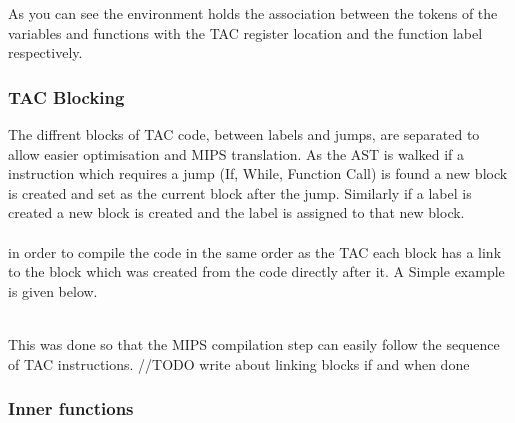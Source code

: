 \documentclass{article}
\begin{document}

As you can see the environment holds the association between the tokens of the variables
and functions with the TAC register location and the function label respectively.

\subsubsection{TAC Blocking}

The diffrent blocks of TAC code, between labels and jumps, are separated to allow
easier optimisation and MIPS translation. As the AST is walked if a instruction which
requires a jump (If, While, Function Call) is found a new block is created and set as the
current block after the jump. Similarly if a label is created a new block is created
and the label is assigned to that new block.\\~\\
in order to compile the code in the same order as the TAC each block has a link to
the block which was created from the code directly after it. A Simple example is
given below.\\~\\

\begin{center}
\end{center}

This was done so that the MIPS compilation step can easily follow the sequence of
TAC instructions. //TODO write about linking blocks if and when done

\subsubsection{Inner functions}
\end{document}
